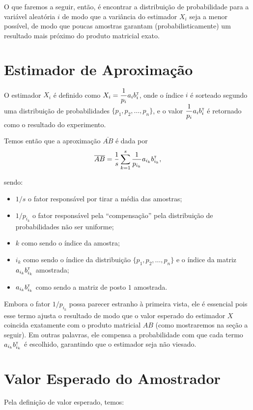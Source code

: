 O que faremos a seguir, então, é encontrar a distribuição de probabilidade para a variável aleatória $i$ de modo que a variância do estimador $X_i$ seja a menor possível, de modo que poucas amostras garantam (probabilisticamente) um resultado mais próximo do produto matricial exato.

\section{Estimador de Aproximação}

  O estimador $X_i$ é definido como $X_i = \dfrac{1}{p_i} a_i b_i^{\scriptscriptstyle\mathsf{T}\mkern-1mu}$, onde o índice $i$ é sorteado segundo uma distribuição de probabilidades $\{p_1, p_2, \dots, p_n\}$, e o valor $\dfrac{1}{p_i} a_i b_i^{\scriptscriptstyle\mathsf{T}\mkern-1mu}$ é retornado como o resultado do experimento.

  Temos então que a aproximação $\bar{AB}$ é dada por \[\overline{AB} = \dfrac{1}{s} \sum_{k=1}^s \dfrac{1}{p_{i_k}} a_{i_{k}} b_{i_{k}}^{\scriptscriptstyle\mathsf{T}\mkern-1mu},\]

  sendo:

  \begin{itemize}
    \item $1/s$ o fator responsável por tirar a média das amostras;
    \item $1/p_{i_{k}}$ o fator responsável pela ``compensação'' pela distribuição de probabilidades não ser uniforme;
    \item $k$ como sendo o índice da amostra;
    \item $i_k$ como sendo o índice da distribuição $\{p_1, p_2, \dots, p_n\}$ e o índice da matriz $a_{i_{k}}b_{i_{k}}^{\scriptscriptstyle\mathsf{T}\mkern-1mu}$ amostrada;
    \item $a_{i_{k}}b_{i_{k}}^{\scriptscriptstyle\mathsf{T}\mkern-1mu}$ como sendo a matriz de posto $1$ amostrada.
  \end{itemize}

  Embora o fator $1/p_{i_{k}}$ possa parecer estranho à primeira vista, ele é essencial pois esse termo ajusta o resultado de modo que o valor esperado do estimador $X$ coincida exatamente com o produto matricial $AB$ (como mostraremos na seção a seguir). Em outras palavras, ele compensa a probabilidade com que cada termo $a_{i_{k}} b_{i_{k}}^{\scriptscriptstyle\mathsf{T}\mkern-1mu}$ é escolhido, garantindo que o estimador seja não viesado.

\section{Valor Esperado do Amostrador}

  Pela definição de valor esperado, temos:

